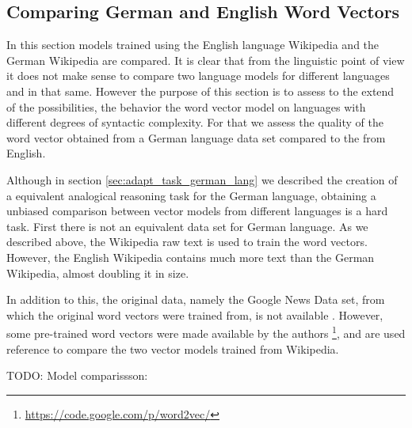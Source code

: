 \subsection{Comparing German and English Word Vectors}
\label{sec:sub:comparing_english_german_w2v}

In this section models trained using the English language Wikipedia and the
German Wikipedia  are compared. It is clear that from the linguistic
point of view it does not make sense to compare two language models for
different languages and in that same. However the purpose of this section is
to assess to the extend of the possibilities, the behavior the word vector model on languages with
different degrees of syntactic complexity. For that we assess the quality of
the word vector obtained from a  German language  data set compared to the
from English.

Although in section \ref{sec:adapt_task_german_lang} we described the
creation of a  equivalent analogical reasoning task for the German language,
obtaining  a unbiased comparison between vector models from different
languages is a hard task.  First there is not an equivalent data set for
German language.  As we described above, the Wikipedia raw text is used to
train the word vectors. However, the English Wikipedia contains much more
text than the German Wikipedia, almost doubling it in size.

In addition to this, the original data, namely the Google News Data set, from
which the original word vectors were trained from, is not available
\cite{DBLP:journals/corr/abs-1301-3781}. However, some pre-trained word
vectors were made available by the authors \footnote{\url{https://code.google.com/p/word2vec/}}, and
are used reference to compare the two vector models trained from Wikipedia.




TODO: Model comparissson:



